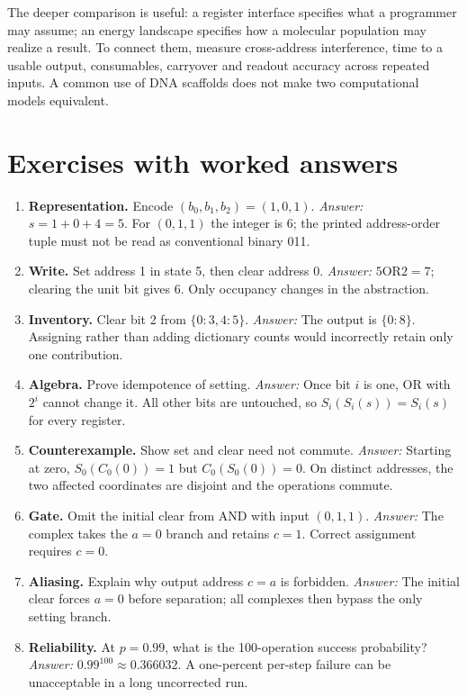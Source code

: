 The deeper comparison is useful: a register interface specifies what a
programmer may assume; an energy landscape specifies how a molecular
population may realize a result. To connect them, measure cross-address
interference, time to a usable output, consumables, carryover and readout
accuracy across repeated inputs. A common use of DNA scaffolds does not
make two computational models equivalent.

\section{Exercises with worked answers}
\begin{enumerate}
\item \textbf{Representation.} Encode $(b_0,b_1,b_2)=(1,0,1)$.
\textit{Answer:} $s=1+0+4=5$. For $(0,1,1)$ the integer is 6;
the printed address-order tuple must not be read as conventional binary 011.
\item \textbf{Write.} Set address 1 in state 5, then clear address 0.
\textit{Answer:} $5\mathbin{\mathrm{OR}}2=7$; clearing the unit bit gives 6.
Only occupancy changes in the abstraction.
\item \textbf{Inventory.} Clear bit 2 from $\{0:3,4:5\}$.
\textit{Answer:} The output is $\{0:8\}$. Assigning rather than adding
dictionary counts would incorrectly retain only one contribution.
\item \textbf{Algebra.} Prove idempotence of setting.
\textit{Answer:} Once bit $i$ is one, OR with $2^i$ cannot change it.
All other bits are untouched, so $S_i(S_i(s))=S_i(s)$ for every register.
\item \textbf{Counterexample.} Show set and clear need not commute.
\textit{Answer:} Starting at zero, $S_0(C_0(0))=1$ but
$C_0(S_0(0))=0$. On distinct addresses, the two affected coordinates
are disjoint and the operations commute.
\item \textbf{Gate.} Omit the initial clear from AND with input $(0,1,1)$.
\textit{Answer:} The complex takes the $a=0$ branch and retains $c=1$.
Correct assignment requires $c=0$.
\item \textbf{Aliasing.} Explain why output address $c=a$ is forbidden.
\textit{Answer:} The initial clear forces $a=0$ before separation;
all complexes then bypass the only setting branch.
\item \textbf{Reliability.} At $p=0.99$, what is the 100-operation success
probability? \textit{Answer:} $0.99^{100}\approx0.366032$.
A one-percent per-step failure can be unacceptable in a long uncorrected run.

\end{enumerate}
